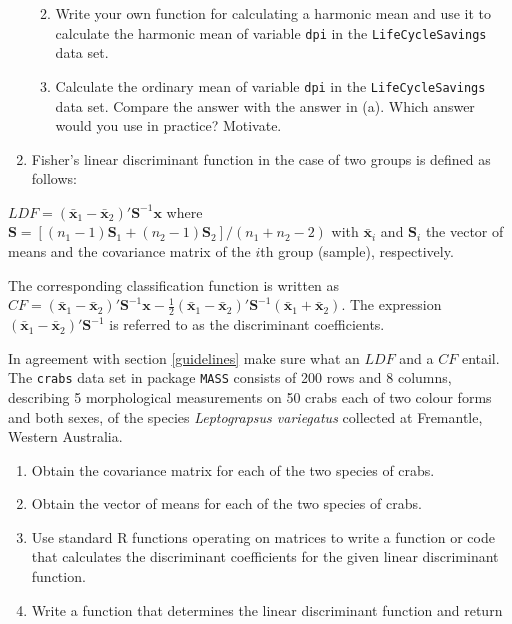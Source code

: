 \documentclass[
]{book}
\begin{document}
\begin{enumerate}
  \begin{enumerate}
  \def\labelenumii{(\roman{enumii})}
  \item
    Write your own function for calculating a harmonic mean and use it to calculate the harmonic mean of variable \texttt{dpi} in the \texttt{LifeCycleSavings} data set.
  \item
    Calculate the ordinary mean of variable \texttt{dpi} in the \texttt{LifeCycleSavings} data set. Compare the answer with the answer in (a). Which answer would you use in practice? Motivate.
  \end{enumerate}
\item
  Fisher's linear discriminant function in the case of two groups is defined as follows:
\end{enumerate}

\(LDF = (\mathbf{\bar{x}}_1 - \mathbf{\bar{x}}_2)' \mathbf{S}^{-1} \mathbf{x}\) where \(\mathbf{S} = [(n_1-1)\mathbf{S}_1 + (n_2-1)\mathbf{S}_2]/(n_1 + n_2 - 2)\) with \(\mathbf{\bar{x}}_i\) and \(\mathbf{S}_i\) the vector of means and the covariance matrix of the \(i\)th group (sample), respectively.

The corresponding classification function is written as \(CF =(\mathbf{\bar{x}}_1 - \mathbf{\bar{x}}_2)' \mathbf{S}^{-1} \mathbf{x} - \frac{1}{2} (\mathbf{\bar{x}}_1 - \mathbf{\bar{x}}_2)' \mathbf{S}^{-1} (\mathbf{\bar{x}}_1 + \mathbf{\bar{x}}_2)\). The expression \((\mathbf{\bar{x}}_1 - \mathbf{\bar{x}}_2)' \mathbf{S}^{-1}\) is referred to as the discriminant coefficients.

In agreement with section \ref{guidelines} make sure what an \(LDF\) and a \(CF\) entail. The \texttt{crabs} data set in package \texttt{MASS} consists of 200 rows and 8 columns, describing 5 morphological measurements on 50 crabs each of two colour forms and both sexes, of the species \emph{Leptograpsus variegatus} collected at Fremantle, Western Australia.

\begin{enumerate}
\def\labelenumi{(\roman{enumi})}
\item
  Obtain the covariance matrix for each of the two species of crabs.
\item
  Obtain the vector of means for each of the two species of crabs.
\item
  Use standard R functions operating on matrices to write a function or code that calculates the discriminant coefficients for the given linear discriminant function.
\item
  Write a function that determines the linear discriminant function and return
\end{enumerate}
\end{document}
